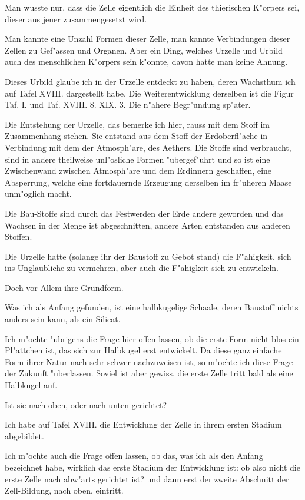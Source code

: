 \documentclass[a4paper, 11pt, oneside, german]{article}
\begin{document}
Man wusste nur, dass die Zelle eigentlich die Einheit des thierischen K"orpers sei, dieser aus jener zusammengesetzt wird.

Man kannte eine Unzahl Formen dieser Zelle, man kannte Verbindungen dieser Zellen zu Gef"assen und Organen. Aber ein Ding, welches Urzelle und Urbild auch des menschlichen K"orpers sein k"onnte, davon hatte man keine Ahnung.

Dieses Urbild glaube ich in der Urzelle entdeckt zu haben, deren Wachsthum ich auf Tafel XVIII. dargestellt habe. Die Weiterentwicklung derselben ist die Figur Taf. I. und Taf. XVIII. 8. XIX. 3. Die n"ahere Begr"undung sp"ater.

Die Entstehung der Urzelle, das bemerke ich hier, rauss mit dem Stoff im Zusammenhang stehen. Sie entstand aus dem Stoff der Erdoberfl"ache in Verbindung mit dem der Atmosph"are, des Aethers. Die Stoffe sind verbraucht, sind in andere theilweise unl"osliche Formen "ubergef"uhrt und so ist eine Zwischenwand zwischen Atmosph"are und dem Erdinnern geschaffen, eine Absperrung, welche eine fortdauernde Erzeugung derselben im fr"uheren Maase unm"oglich macht.

Die Bau-Stoffe sind durch das Festwerden der Erde andere geworden und das Wachsen in der Menge ist abgeschnitten, andere Arten entstanden aus anderen Stoffen.

Die Urzelle hatte (solange ihr der Baustoff zu Gebot stand) die F"ahigkeit, sich ins Unglaubliche zu vermehren, aber auch die F"ahigkeit sich zu entwickeln.

Doch vor Allem ihre Grundform.

Was ich als Anfang gefunden, ist eine halbkugelige Schaale, deren Baustoff nichts anders sein kann, als ein Silicat.

Ich m"ochte "ubrigens die Frage hier offen lassen, ob die erste Form nicht blos ein Pl"attchen ist, das sich zur Halbkugel erst entwickelt. Da diese ganz einfache Form ihrer Natur nach sehr schwer nachzuweisen ist, so m"ochte ich diese Frage der Zukunft "uberlassen. Soviel ist aber gewiss, die erste Zelle tritt bald als eine Halbkugel auf.

Ist sie nach oben, oder nach unten gerichtet?

Ich habe auf Tafel XVIII. die Entwicklung der Zelle in ihrem ersten Stadium abgebildet.

Ich m"ochte auch die Frage offen lassen, ob das, was ich als den Anfang bezeichnet habe, wirklich das erste Stadium der Entwicklung ist: ob also nicht die erste Zelle nach abw"arts gerichtet ist? und dann erst der zweite Abschnitt der Zell-Bildung, nach oben, eintritt.
\end{document}
